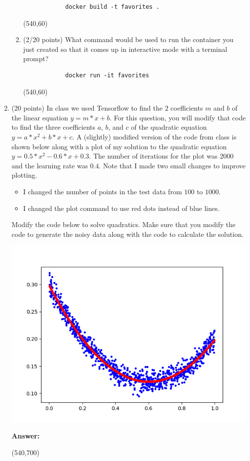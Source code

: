 \documentclass[10pt]{article}
\begin{document}
\begin{enumerate}
\begin{enumerate}
\beginanswers
			\begin{lstlisting}
			docker build -t favorites .
			\end{lstlisting}
\else
\hspace*{-0.4in}\framebox(540,60){}
\fi

\item (2/20 points) What command would be used to run the container you just created so that it 
	comes up in interactive mode with a terminal prompt?

\beginanswers
			\begin{lstlisting}
			docker run -it favorites
			\end{lstlisting}
\else
\hspace*{-0.4in}\framebox(540,60){}
\fi

\end{enumerate}

\newpage

\item   (20 points) In class we used Tensorflow to find the $2$ coefficients $m$ and $b$ of the 
	linear equation $y = m*x + b$. For this question, 
	you will modify that code to find the three coefficients $a$, $b$, and $c$ of the quadratic equation 
	$y = a*x^2 + b*x + c$. A (slightly) modified version of the code from class is shown below along 
	with a plot of my solution to the quadratic equation $y = 0.5 * x^2 - 0.6 * x + 0.3$. The number of
	iterations for the plot was $2000$ and the learning rate was $0.4$. Note that I made
	two small changes to improve plotting. 

\begin{itemize}
	\item I changed the number of points in the test data from $100$ to $1000$.
	\item I changed the plot command to use red dots instead of blue lines.
\end{itemize}

	Modify the code below to solve quadratics. Make sure that you
	modify the code to generate the noisy data along with the code to calculate the solution.


\includegraphics[width=0.6\linewidth]{images/quadratic.png}

\newpage



\beginanswers
\textbf{Answer:}

\else
\hspace*{-0.4in}\framebox(540,700){}
\fi
\newpage

\end{enumerate}
\end{document}
